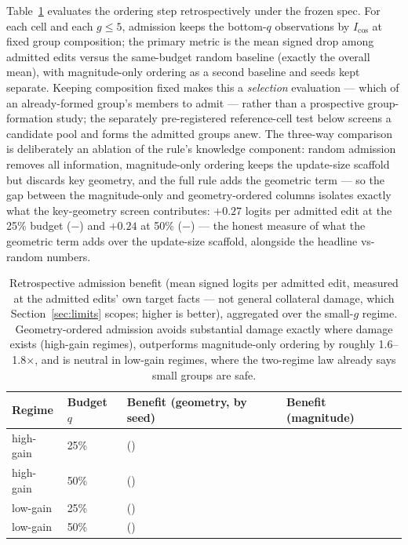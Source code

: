 \documentclass[preprint,12pt]{elsarticle}
\theoremstyle{definition}
\begin{document}
Table~\ref{tab:benefit} evaluates the ordering step retrospectively under the frozen spec.
For each cell and each $g\leq5$, admission keeps the bottom-$q$ observations by $I_{\cos}$ at
fixed group composition; the primary metric is the mean signed drop among admitted edits
versus the same-budget random baseline (exactly the overall mean), with magnitude-only
ordering as a second baseline and seeds kept separate. Keeping composition fixed makes
this a \emph{selection} evaluation --- which of an already-formed group's members to
admit --- rather than a prospective group-formation study; the separately pre-registered
reference-cell test below screens a candidate pool and forms the admitted groups anew. The
three-way comparison is
deliberately an ablation of the rule's knowledge component: random admission removes
all information, magnitude-only ordering keeps the update-size scaffold but discards
key geometry, and the full rule adds the geometric term --- so the gap between the
magnitude-only and geometry-ordered columns isolates exactly what the key-geometry
screen contributes: $+0.27$ logits per admitted edit at the 25\% budget
(\benefitHighQtwofive{}$-$\benefitMagQtwofive{}) and $+0.24$ at 50\%
(\benefitHighQfifty{}$-$\benefitMagQfifty{}) --- the honest measure of what
the geometric term adds over the update-size scaffold, alongside the headline
vs-random numbers.

\begin{table}[htbp]
\centering
\caption{Retrospective admission benefit (mean signed logits per admitted edit,
measured at the admitted edits' own target facts --- not general collateral damage,
which Section~\ref{sec:limits} scopes; higher is better), aggregated over the
small-$g$ regime. Geometry-ordered admission avoids substantial
damage exactly where damage exists (high-gain regimes), outperforms magnitude-only ordering
by roughly 1.6--1.8$\times$, and is neutral in low-gain regimes, where the two-regime law
already says small groups are safe.}
\label{tab:benefit}
{\small
\begin{tabular}{llll}
\toprule
Regime & Budget $q$ & Benefit (geometry, by seed) & Benefit (magnitude) \\
\midrule
high-gain & 25\% & \benefitHighQtwofive{} \; (\benefitHighQtwofiveSeeds{}) & \benefitMagQtwofive{} \\
high-gain & 50\% & \benefitHighQfifty{} \; (\benefitHighQfiftySeeds{})     & \benefitMagQfifty{} \\
low-gain  & 25\% & \benefitLowQtwofive{} \; (\benefitLowQtwofiveSeeds{})    & \benefitMagLowQtwofive{} \\
low-gain  & 50\% & \benefitLowQfifty{} \; (\benefitLowQfiftySeeds{})        & \benefitMagLowQfifty{} \\
\bottomrule
\end{tabular}
}
\end{table}
\end{document}
